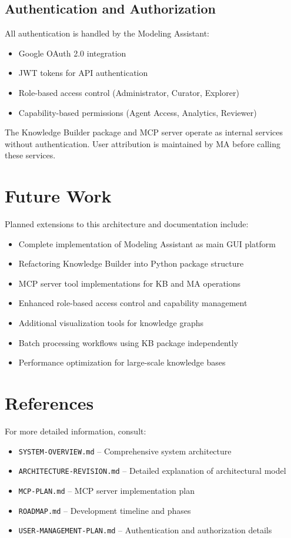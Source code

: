 \documentclass[11pt]{article}
\begin{document}
\subsection{Authentication and Authorization}

All authentication is handled by the Modeling Assistant:
\begin{itemize}[noitemsep]
  \item Google OAuth 2.0 integration
  \item JWT tokens for API authentication
  \item Role-based access control (Administrator, Curator, Explorer)
  \item Capability-based permissions (Agent Access, Analytics, Reviewer)
\end{itemize}

The Knowledge Builder package and MCP server operate as internal services without authentication. User attribution is maintained by MA before calling these services.

\section{Future Work}

Planned extensions to this architecture and documentation include:

\begin{itemize}[noitemsep]
  \item Complete implementation of Modeling Assistant as main GUI platform
  \item Refactoring Knowledge Builder into Python package structure
  \item MCP server tool implementations for KB and MA operations
  \item Enhanced role-based access control and capability management
  \item Additional visualization tools for knowledge graphs
  \item Batch processing workflows using KB package independently
  \item Performance optimization for large-scale knowledge bases
\end{itemize}

\section{References}

For more detailed information, consult:

\begin{itemize}[noitemsep]
  \item \texttt{SYSTEM-OVERVIEW.md} -- Comprehensive system architecture
  \item \texttt{ARCHITECTURE-REVISION.md} -- Detailed explanation of architectural model
  \item \texttt{MCP-PLAN.md} -- MCP server implementation plan
  \item \texttt{ROADMAP.md} -- Development timeline and phases
  \item \texttt{USER-MANAGEMENT-PLAN.md} -- Authentication and authorization details
\end{itemize}
\end{document}
